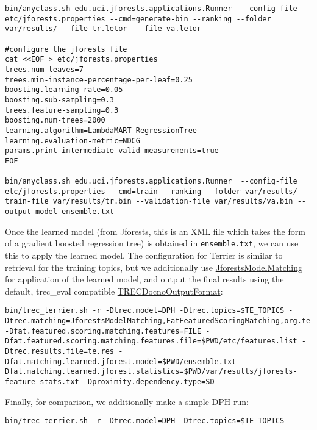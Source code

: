 \begin{verbatim}
bin/anyclass.sh edu.uci.jforests.applications.Runner  --config-file etc/jforests.properties --cmd=generate-bin --ranking --folder var/results/ --file tr.letor  --file va.letor

#configure the jforests file
cat <<EOF > etc/jforests.properties
trees.num-leaves=7
trees.min-instance-percentage-per-leaf=0.25
boosting.learning-rate=0.05
boosting.sub-sampling=0.3
trees.feature-sampling=0.3
boosting.num-trees=2000
learning.algorithm=LambdaMART-RegressionTree
learning.evaluation-metric=NDCG
params.print-intermediate-valid-measurements=true
EOF

bin/anyclass.sh edu.uci.jforests.applications.Runner  --config-file etc/jforests.properties --cmd=train --ranking --folder var/results/ --train-file var/results/tr.bin --validation-file var/results/va.bin --output-model ensemble.txt
\end{verbatim}

Once the learned model (from Jforests, this is an XML file which takes
the form of a gradient boosted regression tree) is obtained in
\texttt{ensemble.txt}, we can use this to apply the learned model. The
configuration for Terrier is similar to retrieval for the training
topics, but we additionally use
\href{javadoc/org/terrier/matching/JforestsModelMatching.html}{JforestsModelMatching}
for application of the learned model, and output the final results using
the default, trec\_eval compatible
\href{javadoc/org/terrier/structures/outputformat/TRECDocnoOutputFormat.html}{TRECDocnoOutputFormat}:

\begin{verbatim}
bin/trec_terrier.sh -r -Dtrec.model=DPH -Dtrec.topics=$TE_TOPICS -Dtrec.matching=JforestsModelMatching,FatFeaturedScoringMatching,org.terrier.matching.daat.FatFull -Dfat.featured.scoring.matching.features=FILE -Dfat.featured.scoring.matching.features.file=$PWD/etc/features.list -Dtrec.results.file=te.res -Dfat.matching.learned.jforest.model=$PWD/ensemble.txt -Dfat.matching.learned.jforest.statistics=$PWD/var/results/jforests-feature-stats.txt -Dproximity.dependency.type=SD
\end{verbatim}

Finally, for comparison, we additionally make a simple DPH run:

\begin{verbatim}
bin/trec_terrier.sh -r -Dtrec.model=DPH -Dtrec.topics=$TE_TOPICS
\end{verbatim}

